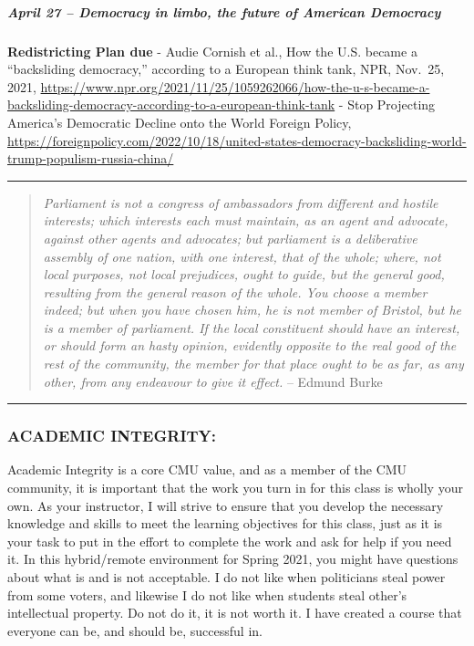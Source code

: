 \documentclass[
]{article}
\begin{document}
\hypertarget{april-27-democracy-in-limbo-the-future-of-american-democracy}{%
\subparagraph{April 27 -- Democracy in limbo, the future of American
Democracy}\label{april-27-democracy-in-limbo-the-future-of-american-democracy}}

\textbf{Redistricting Plan due} - Audie Cornish et al., How the U.S.
became a ``backsliding democracy,'' according to a European think tank,
NPR, Nov.~25, 2021,
\url{https://www.npr.org/2021/11/25/1059262066/how-the-u-s-became-a-backsliding-democracy-according-to-a-european-think-tank}
- Stop Projecting America's Democratic Decline onto the World Foreign
Policy,
\url{https://foreignpolicy.com/2022/10/18/united-states-democracy-backsliding-world-trump-populism-russia-china/}

\begin{center}\rule{0.5\linewidth}{0.5pt}\end{center}

\begin{quote}
\emph{Parliament is not a congress of ambassadors from different and
hostile interests; which interests each must maintain, as an agent and
advocate, against other agents and advocates; but parliament is a
deliberative assembly of one nation, with one interest, that of the
whole; where, not local purposes, not local prejudices, ought to guide,
but the general good, resulting from the general reason of the whole.
You choose a member indeed; but when you have chosen him, he is not
member of Bristol, but he is a member of parliament. If the local
constituent should have an interest, or should form an hasty opinion,
evidently opposite to the real good of the rest of the community, the
member for that place ought to be as far, as any other, from any
endeavour to give it effect.} -- Edmund Burke
\end{quote}

\begin{center}\rule{0.5\linewidth}{0.5pt}\end{center}

\hypertarget{academic-integrity}{%
\subsubsection{ACADEMIC INTEGRITY:}\label{academic-integrity}}

Academic Integrity is a core CMU value, and as a member of the CMU
community, it is important that the work you turn in for this class is
wholly your own. As your instructor, I will strive to ensure that you
develop the necessary knowledge and skills to meet the learning
objectives for this class, just as it is your task to put in the effort
to complete the work and ask for help if you need it. In this
hybrid/remote environment for Spring 2021, you might have questions
about what is and is not acceptable. I do not like when politicians
steal power from some voters, and likewise I do not like when students
steal other's intellectual property. Do not do it, it is not worth it. I
have created a course that everyone can be, and should be, successful
in.
\end{document}
